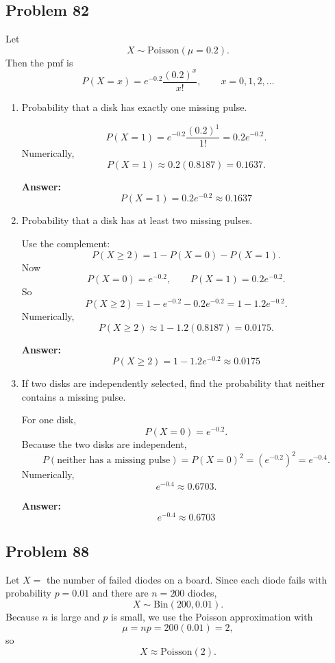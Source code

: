 \documentclass[11pt]{article}
\begin{document}
\subsection*{Problem 82}

Let
\[
X\sim \mathrm{Poisson}(\mu=0.2).
\]
Then the pmf is
\[
P(X=x)=e^{-0.2}\frac{(0.2)^x}{x!}, \qquad x=0,1,2,\dots
\]

\begin{enumerate}
    \item[(a)] Probability that a disk has exactly one missing pulse.

    \[
    P(X=1)=e^{-0.2}\frac{(0.2)^1}{1!}=0.2e^{-0.2}.
    \]
    Numerically,
    \[
    P(X=1)\approx 0.2(0.8187)=0.1637.
    \]

    \textbf{Answer:}
    \[
    \boxed{P(X=1)=0.2e^{-0.2}\approx 0.1637}
    \]

    \item[(b)] Probability that a disk has at least two missing pulses.

    Use the complement:
    \[
    P(X\ge 2)=1-P(X=0)-P(X=1).
    \]
    Now
    \[
    P(X=0)=e^{-0.2}, \qquad P(X=1)=0.2e^{-0.2}.
    \]
    So
    \[
    P(X\ge 2)=1-e^{-0.2}-0.2e^{-0.2}
    =1-1.2e^{-0.2}.
    \]
    Numerically,
    \[
    P(X\ge 2)\approx 1-1.2(0.8187)=0.0175.
    \]

    \textbf{Answer:}
    \[
    \boxed{P(X\ge 2)=1-1.2e^{-0.2}\approx 0.0175}
    \]

    \item[(c)] If two disks are independently selected, find the probability that neither contains a missing pulse.

    For one disk,
    \[
    P(X=0)=e^{-0.2}.
    \]
    Because the two disks are independent,
    \[
    P(\text{neither has a missing pulse})=P(X=0)^2=(e^{-0.2})^2=e^{-0.4}.
    \]
    Numerically,
    \[
    e^{-0.4}\approx 0.6703.
    \]

    \textbf{Answer:}
    \[
    \boxed{e^{-0.4}\approx 0.6703}
    \]
\end{enumerate}

\subsection*{Problem 88}

Let \(X=\) the number of failed diodes on a board. Since each diode fails with probability \(p=0.01\) and there are \(n=200\) diodes,
\[
X\sim \mathrm{Bin}(200,0.01).
\]
Because \(n\) is large and \(p\) is small, we use the Poisson approximation with
\[
\mu=np=200(0.01)=2,
\]
so
\[
X \approx \mathrm{Poisson}(2).
\]
\end{document}
